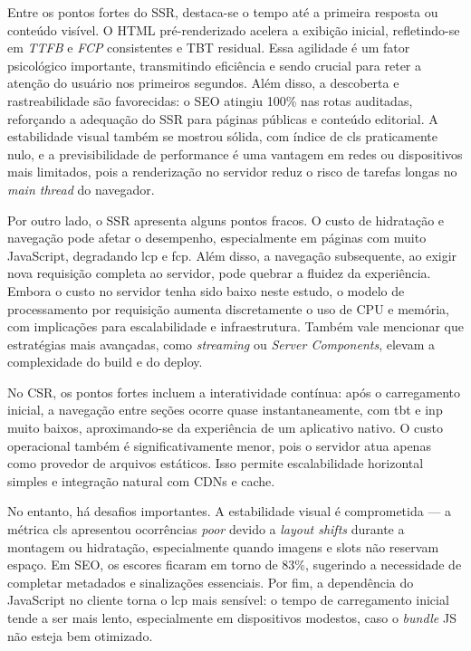 {Entre os pontos fortes do SSR, destaca-se o tempo até a primeira resposta ou conteúdo visível. O HTML pré-renderizado acelera a exibição inicial, refletindo-se em \textit{TTFB} e \textit{FCP} consistentes e TBT residual. Essa agilidade é um fator psicológico importante, transmitindo eficiência e sendo crucial para reter a atenção do usuário nos primeiros segundos. Além disso, a descoberta e rastreabilidade são favorecidas: o SEO atingiu 100\% nas rotas auditadas, reforçando a adequação do SSR para páginas públicas e conteúdo editorial. A estabilidade visual também se mostrou sólida, com índice de \acrshort{cls} praticamente nulo, e a previsibilidade de performance é uma vantagem em redes ou dispositivos mais limitados, pois a renderização no servidor reduz o risco de tarefas longas no \emph{main thread} do navegador.

Por outro lado, o SSR apresenta alguns pontos fracos. O custo de hidratação e navegação pode afetar o desempenho, especialmente em páginas com muito JavaScript, degradando \acrshort{lcp} e \acrshort{fcp}. Além disso, a navegação subsequente, ao exigir nova requisição completa ao servidor, pode quebrar a fluidez da experiência. Embora o custo no servidor tenha sido baixo neste estudo, o modelo de processamento por requisição aumenta discretamente o uso de CPU e memória, com implicações para escalabilidade e infraestrutura. Também vale mencionar que estratégias mais avançadas, como \emph{streaming} ou \emph{Server Components}, elevam a complexidade do build e do deploy.

No CSR, os pontos fortes incluem a interatividade contínua: após o carregamento inicial, a navegação entre seções ocorre quase instantaneamente, com \acrshort{tbt} e \acrshort{inp} muito baixos, aproximando-se da experiência de um aplicativo nativo. O custo operacional também é significativamente menor, pois o servidor atua apenas como provedor de arquivos estáticos. Isso permite escalabilidade horizontal simples e integração natural com CDNs e cache.

No entanto, há desafios importantes. A estabilidade visual é comprometida — a métrica \acrshort{cls} apresentou ocorrências \textit{poor} devido a \emph{layout shifts} durante a montagem ou hidratação, especialmente quando imagens e slots não reservam espaço. Em SEO, os escores ficaram em torno de 83\%, sugerindo a necessidade de completar metadados e sinalizações essenciais. Por fim, a dependência do JavaScript no cliente torna o \acrshort{lcp} mais sensível: o tempo de carregamento inicial tende a ser mais lento, especialmente em dispositivos modestos, caso o \emph{bundle} JS não esteja bem otimizado.

}
